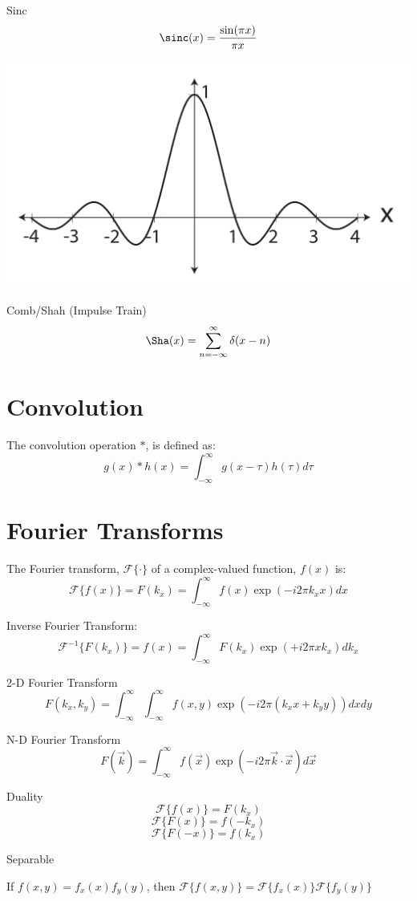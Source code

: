 \documentclass[11pt]{article}
\begin{document}
Sinc
$$\sinc(x) = \frac{\sin(\pi x)}{\pi x}$$
\begin{center}
\includegraphics[width=.4\columnwidth]{sinc.pdf}
\end{center}

Comb/Shah (Impulse Train)
$$\Sha(x) = \sum_{n = -\infty}^\infty \delta(x - n)$$

\section*{Convolution}
The convolution operation $\ast$, is defined as:
$$ g(x) \ast h(x) = \int_{-\infty}^\infty g(x-\tau) h(\tau) d\tau$$

\section*{Fourier Transforms}

The Fourier transform, $ \mathcal{F} \{ \cdot \}$ of a complex-valued function, $f(x)$ is:
$$ \mathcal{F} \{ f(x) \} = F(k_x) = \int_{-\infty}^\infty f(x) \exp(-i 2 \pi k_x x) dx$$

Inverse Fourier Transform:
$$ \mathcal{F}^{-1} \{ F(k_x) \} = f(x) = \int_{-\infty}^\infty F(k_x) \exp(+i 2 \pi x k_x) dk_x$$

2-D Fourier Transform
$$ F(k_x,k_y) = \int_{-\infty}^\infty \int_{-\infty}^\infty f(x,y) \exp(-i 2 \pi (k_x x + k_y y) ) dx dy$$

N-D Fourier Transform
$$ F(\vec{k}) = \int_{-\infty}^\infty f(\vec{x}) \exp(-i 2 \pi \vec{k}\cdot \vec{x}) d\vec{x}$$

Duality
$$\mathcal{F}\{f(x)\} = F(k_x)$$
$$\mathcal{F}\{F(x)\} = f(-k_x)$$
$$\mathcal{F}\{F(-x)\} = f(k_x)$$

Separable

If $f(x,y) = f_x(x) f_y(y)$, then $\mathcal{F}\{f(x,y)\} = \mathcal{F}\{f_x(x)\} \mathcal{F}\{f_y(y)\}$
\end{document}
